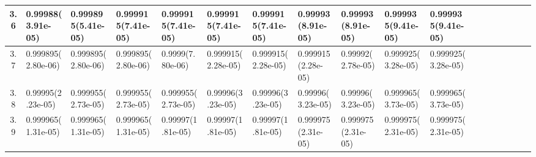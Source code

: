\documentclass[
	article,			%
	12pt,				%
	twoside,			%
	a4paper,			%
	english,			%
	brazil,				%
	]{abntex2}
\begin{document}
\begin{landscape}
\begin{table}
\begin{tabular}{c||p{18mm}|p{18mm}|p{18mm}|p{18mm}|p{18mm}|p{18mm}|p{18mm}|p{18mm}|p{18mm}|p{18mm}|p{18mm}|p{18mm}|p{18mm}|p{18mm}|p{18mm}|p{18mm}|p{18mm}}
    			3.6 &0.99988\newline( 3.91e-05)&0.999895\newline(5.41e-05)&0.999915\newline(7.41e-05)&0.999915\newline(7.41e-05)&0.999915\newline(7.41e-05)&0.999915\newline(7.41e-05)&0.99993\newline(8.91e-05)&0.99993\newline(8.91e-05)&0.999935\newline(9.41e-05)&0.999935\newline(9.41e-05)\\\hline
    			3.7 &0.999895\newline(2.80e-06)&0.999895\newline(2.80e-06)&0.999895\newline( 2.80e-06)&0.9999\newline(7.80e-06)&0.999915\newline(2.28e-05)&0.999915\newline(2.28e-05)&0.999915\newline(2.28e-05)&0.99992\newline(2.78e-05)&0.999925\newline(3.28e-05)&0.999925\newline(3.28e-05)\\\hline
    			3.8 &0.99995\newline(2.23e-05)&0.999955\newline(2.73e-05)&0.999955\newline(2.73e-05)&0.999955\newline(2.73e-05)&0.99996\newline(3.23e-05)&0.99996\newline(3.23e-05)&0.99996\newline(3.23e-05)&0.99996\newline(3.23e-05)&0.999965\newline(3.73e-05)&0.999965\newline(3.73e-05)\\\hline
    			3.9 &0.999965\newline(1.31e-05)&0.999965\newline( 1.31e-05)&0.999965\newline(1.31e-05)&0.99997\newline(1.81e-05)&0.99997\newline(1.81e-05)&0.99997\newline(1.81e-05)&0.999975\newline(2.31e-05)&0.999975\newline(2.31e-05)&0.999975\newline(2.31e-05)&0.999975\newline(2.31e-05)\\

\end{tabular}
\end{table}
\end{landscape}
\end{document}
